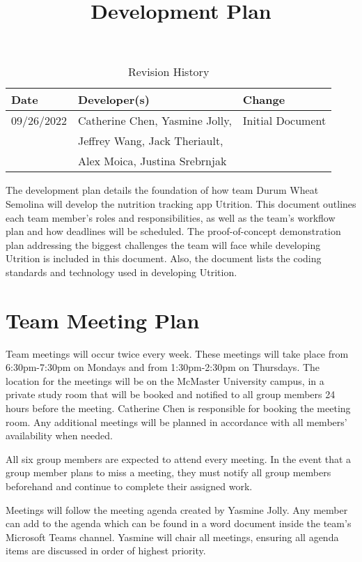 \documentclass{article}
\title{Development Plan\\\progname}
\author{\authname}
\date{}
\begin{document}
\maketitle

\begin{table}[hp]
\caption{Revision History} \label{TblRevisionHistory}
\begin{tabularx}{\textwidth}{llX}
\toprule
\textbf{Date} & \textbf{Developer(s)} & \textbf{Change}\\
\midrule
09/26/2022 & Catherine Chen, Yasmine Jolly, &Initial Document\\ 
&Jeffrey Wang, Jack Theriault, &\\
&Alex Moica, Justina Srebrnjak &\\
\bottomrule
\end{tabularx}
\end{table}

\newpage

The development plan details the foundation of how team Durum Wheat Semolina will develop the nutrition tracking app Utrition. This document outlines each team member’s roles and responsibilities, as well as the team’s workflow plan and how deadlines will be scheduled. The proof-of-concept demonstration plan addressing the biggest challenges the team will face while developing Utrition is included in this document. Also, the document lists the coding standards and technology used in developing Utrition.

\section{Team Meeting Plan}

Team meetings will occur twice every week. These meetings will take place from 6:30pm-7:30pm on Mondays and from 1:30pm-2:30pm on Thursdays. The location for the meetings will be on the McMaster University campus, in a private study room that will be booked and notified to all group members 24 hours before the meeting. Catherine Chen is responsible for booking the meeting room. Any additional meetings will be planned in accordance with all members'  availability when needed.

All six group members are expected to attend every meeting. In the event that a group member plans to miss a meeting, they must notify all group members beforehand and continue to complete their assigned work.

Meetings will follow the meeting agenda created by Yasmine Jolly. Any member can add to the agenda which can be found in a word document inside the team's Microsoft Teams channel. Yasmine will chair all meetings, ensuring all agenda items are discussed in order of highest priority.
\end{document}
